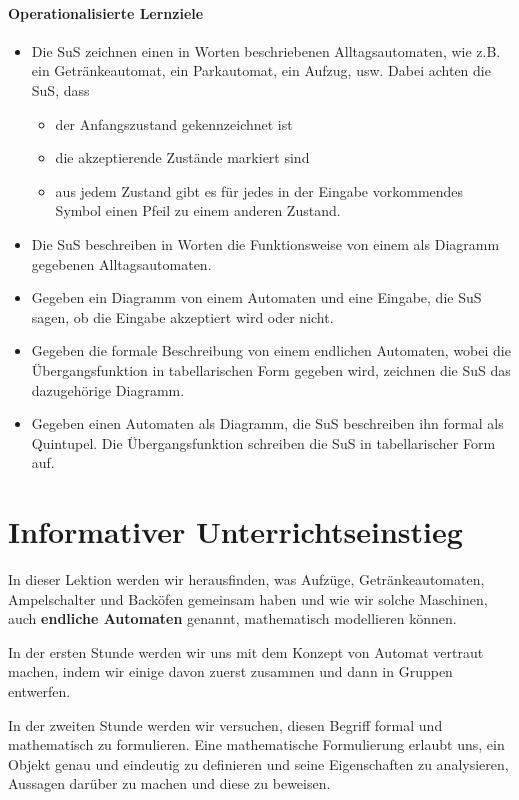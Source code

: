 \documentclass{article}
\begin{document}
\paragraph{Operationalisierte Lernziele}
\begin{itemize}
\item Die SuS zeichnen einen in Worten beschriebenen Alltagsautomaten, wie z.B. ein Getränkeautomat, ein Parkautomat, ein Aufzug, usw. Dabei achten die SuS, dass
	\begin{itemize}
		\item der Anfangszustand gekennzeichnet ist
		\item die akzeptierende Zustände markiert sind
		\item aus jedem Zustand gibt es für jedes in der Eingabe vorkommendes Symbol einen Pfeil zu einem anderen Zustand.
	\end{itemize}
\item Die SuS beschreiben in Worten die Funktionsweise von einem als Diagramm gegebenen Alltagsautomaten.
\item Gegeben ein Diagramm von einem Automaten und eine Eingabe, die SuS sagen, ob die Eingabe akzeptiert wird oder nicht.
\item Gegeben die formale Beschreibung von einem endlichen Automaten, wobei die Übergangsfunktion in tabellarischen Form gegeben wird, zeichnen die SuS das dazugehörige Diagramm.
\item Gegeben einen Automaten als Diagramm, die SuS beschreiben ihn formal als Quintupel. Die Übergangsfunktion schreiben die SuS in tabellarischer Form auf.
\end{itemize}

\section{Informativer Unterrichtseinstieg}

In dieser Lektion werden wir herausfinden, was Aufzüge, Getränkeautomaten, Ampelschalter und Backöfen gemeinsam haben und wie wir solche Maschinen, auch \textbf{endliche Automaten} genannt, mathematisch modellieren können.

In der ersten Stunde werden wir uns mit dem Konzept von Automat vertraut machen, indem wir einige davon zuerst zusammen und dann in Gruppen entwerfen.

In der zweiten Stunde werden wir versuchen, diesen Begriff formal und mathematisch zu formulieren. Eine mathematische Formulierung erlaubt uns, ein Objekt genau und eindeutig zu definieren und seine Eigenschaften zu analysieren, Aussagen darüber zu machen und diese zu beweisen.
\end{document}
